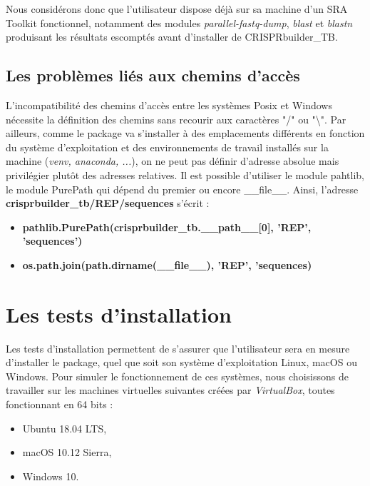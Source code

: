 \documentclass[twoside,a4paper,11pt,frenchb,openany]{report}
\begin{document}
Nous considérons donc que l'utilisateur dispose déjà sur sa machine d'un SRA Toolkit fonctionnel, notamment des modules \textit{parallel-fastq-dump}, \textit{blast} et \textit{blastn} produisant les résultats escomptés avant d'installer de CRISPRbuilder\_TB.



\subsection{Les problèmes liés aux chemins d'accès}

L'incompatibilité des chemins d'accès entre les systèmes Posix et Windows nécessite la définition des chemins sans recourir aux caractères "/" ou "\textbackslash". Par ailleurs, comme le package va s'installer à des emplacements différents en fonction du système d'exploitation et des environnements de travail installés sur la machine (\textit{venv, anaconda, ...}), on ne peut pas définir d'adresse absolue mais privilégier plutôt des adresses relatives. Il est possible d'utiliser le module pahtlib, le module PurePath qui dépend du premier ou encore \_\_file\_\_. Ainsi, l'adresse  \textbf{crisprbuilder\_tb/REP/sequences} s'écrit :
\begin{itemize}
\item \textbf{pathlib.PurePath(crisprbuilder\_tb.\_\_path\_\_[0], 'REP', 'sequences')}
\item \textbf{os.path.join(path.dirname(\_\_file\_\_), 'REP', 'sequences)}
\end{itemize}






\section{Les tests d'installation}

Les tests d'installation permettent de s'assurer que l'utilisateur sera en mesure d'installer le package, quel que soit son système d'exploitation Linux, macOS ou Windows. Pour simuler le fonctionnement de ces systèmes, nous choisissons de travailler sur les machines virtuelles suivantes créées par \textit{VirtualBox}, toutes fonctionnant en 64 bits : 
\begin{itemize}
\item Ubuntu 18.04 LTS, 
\item macOS 10.12 Sierra, 
\item Windows 10.
\end{itemize}
\end{document}
